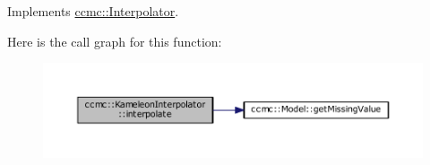 Implements \hyperlink{classccmc_1_1_interpolator_ae02453da5a1a8f472f33b2058424ddb6}{ccmc\-::\-Interpolator}.



Here is the call graph for this function\-:\nopagebreak
\begin{figure}[H]
\begin{center}
\leavevmode
\includegraphics[width=350pt]{classccmc_1_1_kameleon_interpolator_ac0f406b8da511a973a1d86409eb389d6_cgraph}
\end{center}
\end{figure}


